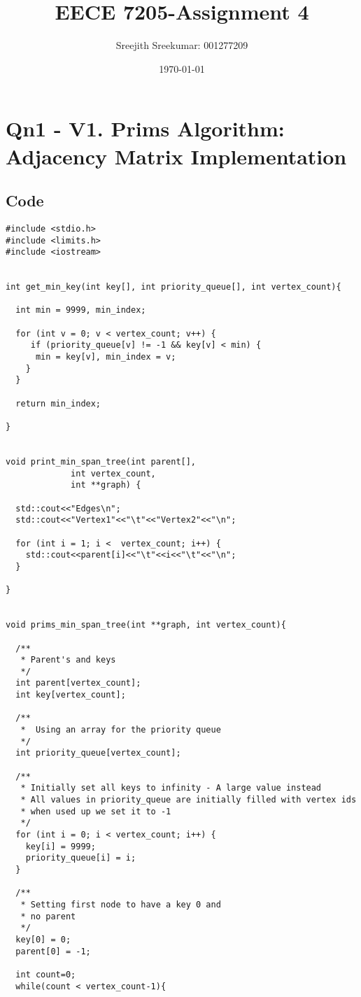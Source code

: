 \documentclass{article}
\title{EECE 7205-Assignment 4}
\author{Sreejith Sreekumar: 001277209}
\date{\today}
\begin{document}
\maketitle
\section{Qn1 - V1. Prims Algorithm: Adjacency Matrix Implementation}

\subsection{Code}
\begin{verbatim}
#include <stdio.h> 
#include <limits.h> 
#include <iostream>
  

int get_min_key(int key[], int priority_queue[], int vertex_count){

  int min = 9999, min_index; 
  
  for (int v = 0; v < vertex_count; v++) {
     if (priority_queue[v] != -1 && key[v] < min) {
      min = key[v], min_index = v;
    }
  }
  
  return min_index; 
  
}


void print_min_span_tree(int parent[],
			 int vertex_count,
			 int **graph) {

  std::cout<<"Edges\n";
  std::cout<<"Vertex1"<<"\t"<<"Vertex2"<<"\n";
  
  for (int i = 1; i <  vertex_count; i++) {
    std::cout<<parent[i]<<"\t"<<i<<"\t"<<"\n";
  }
  
} 

  
void prims_min_span_tree(int **graph, int vertex_count){
  
  /**
   * Parent's and keys
   */
  int parent[vertex_count];  
  int key[vertex_count];

  /**
   *  Using an array for the priority queue
   */
  int priority_queue[vertex_count];  
  
  /**
   * Initially set all keys to infinity - A large value instead
   * All values in priority_queue are initially filled with vertex ids
   * when used up we set it to -1
   */
  for (int i = 0; i < vertex_count; i++) {
    key[i] = 9999;
    priority_queue[i] = i;
  }

  /**
   * Setting first node to have a key 0 and
   * no parent
   */
  key[0] = 0;      
  parent[0] = -1; 

  int count=0;
  while(count < vertex_count-1){


\end{verbatim}
\end{document}
